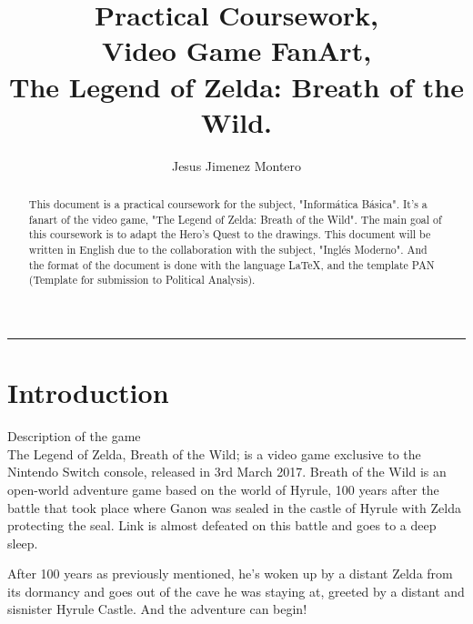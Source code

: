 \documentclass{cup-pan}
\title{Practical Coursework,\\ Video Game FanArt, \\ The Legend of Zelda: Breath of the Wild.}
\author{Jesus Jimenez Montero}
\affil[1] {Informática Básica, VJ1202}
\affil[2] {Expresión Artística, VJ1204}
\affil[3] {Inglés Moderno, VJ1205}
\begin{document}
\maketitle
\textcolor{PANDarkBlue}{\hrule}


\tableofcontents
\newpage
\listoffigures
\newpage

\begin{abstract}
    This document is a practical coursework for the subject, "Informática Básica". It's a fanart of the video game, "The Legend of Zelda: Breath of the Wild". The main goal of this coursework is to adapt the Hero's Quest to the drawings.
    This document will be written in English due to the collaboration with the subject, "Inglés Moderno". 
    And the format of the document is done with the language LaTeX, and the template PAN (Template for submission to Political Analysis).

\end{abstract}


\section{Introduction}

    \textcolor{PANDarkBlue}{\large Description of the game}\\
    
    The Legend of Zelda, Breath of the Wild; is a video game exclusive to the Nintendo Switch console, released in 3rd March 2017. 
    Breath of the Wild is an open-world adventure game based on the world of Hyrule, 100 years after the battle that took place where Ganon was sealed in the castle of Hyrule with Zelda protecting the seal. Link is almost defeated on this battle and goes to a deep sleep.
    
    After 100 years as previously mentioned, he's woken up by a distant Zelda from its dormancy and goes out of the cave he was staying at, greeted by a distant and sisnister Hyrule Castle. And the adventure can begin!\\
    
\end{document}
